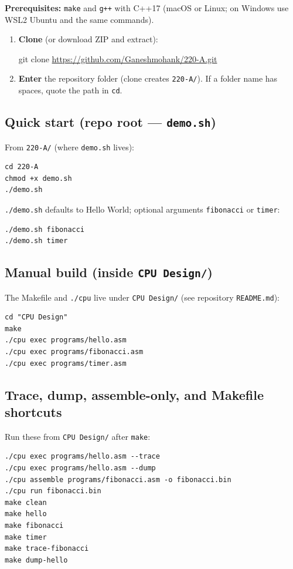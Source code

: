 \documentclass[12pt]{article}
\newcommand{\GitHubCloneURL}{https://github.com/Ganeshmohank/220-A.git}
\begin{document}
\textbf{Prerequisites:} \texttt{make} and \texttt{g++} with C++17 (macOS or Linux; on Windows use WSL2 Ubuntu and the same commands).

\begin{enumerate}
  \item \textbf{Clone} (or download ZIP and extract):
  \begin{center}
    \ttfamily git clone \url{\GitHubCloneURL}
  \end{center}
  \item \textbf{Enter} the repository folder (clone creates \texttt{220-A/}). If a folder name has spaces, quote the path in \texttt{cd}.
\end{enumerate}

\subsection*{Quick start (repo root --- \texttt{demo.sh})}
\noindent From \texttt{220-A/} (where \texttt{demo.sh} lives):
\begin{lstlisting}
cd 220-A
chmod +x demo.sh
./demo.sh
\end{lstlisting}

\noindent\texttt{./demo.sh} defaults to Hello World; optional arguments \texttt{fibonacci} or \texttt{timer}:
\begin{lstlisting}
./demo.sh fibonacci
./demo.sh timer
\end{lstlisting}

\subsection*{Manual build (inside \texttt{CPU Design/})}
\noindent The Makefile and \texttt{./cpu} live under \texttt{CPU Design/} (see repository \texttt{README.md}):
\begin{lstlisting}
cd "CPU Design"
make
./cpu exec programs/hello.asm
./cpu exec programs/fibonacci.asm
./cpu exec programs/timer.asm
\end{lstlisting}

\subsection*{Trace, dump, assemble-only, and Makefile shortcuts}
\noindent Run these from \texttt{CPU Design/} after \texttt{make}:
\begin{lstlisting}
./cpu exec programs/hello.asm --trace
./cpu exec programs/hello.asm --dump
./cpu assemble programs/fibonacci.asm -o fibonacci.bin
./cpu run fibonacci.bin
make clean
make hello
make fibonacci
make timer
make trace-fibonacci
make dump-hello
\end{lstlisting}
\vfill
\clearpage
\end{document}
